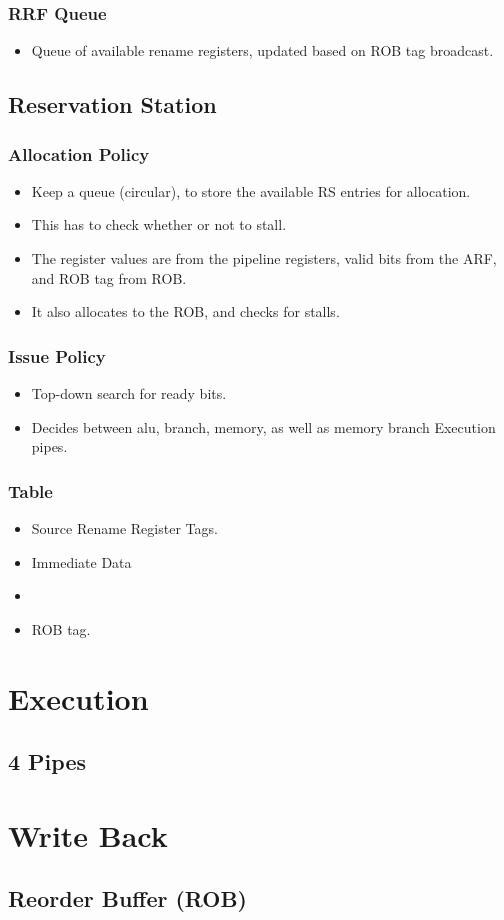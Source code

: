 \documentclass{article}
\begin{document}
\subsubsection{RRF Queue}
\begin{itemize}
\item Queue of available rename registers, updated based on ROB tag broadcast.
\end{itemize}
\subsection{Reservation Station}
\subsubsection{Allocation Policy}
\begin{itemize}
\item Keep a queue (circular), to store the available RS entries for allocation.
\item This has to check whether or not to stall.
\item The register values are from the pipeline registers, valid bits from the ARF, and ROB tag from ROB.
\item It also allocates to the ROB, and checks for stalls.
\end{itemize}
\subsubsection{Issue Policy}
\begin{itemize}
\item Top-down search for ready bits.
\item Decides between alu, branch, memory, as well as memory branch Execution pipes.
\end{itemize}
\subsubsection{Table}
\begin{itemize}
\item Source Rename Register Tags.
\item Immediate Data
\item 
\item ROB tag.
\end{itemize}
\section{Execution}
\subsection{4 Pipes}

\section{Write Back}
\subsection{Reorder Buffer (ROB)}
\end{document}
